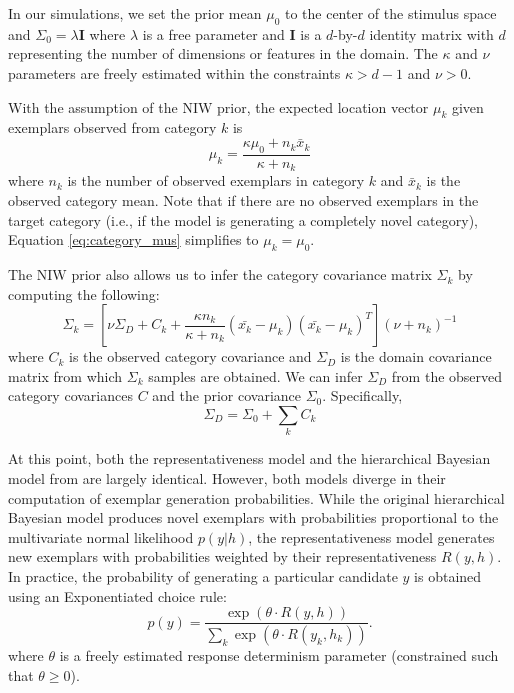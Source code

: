 \documentclass[12pt]{article}
\begin{document}
\begin{flushleft}
In our simulations, we set the prior mean $\mu_0$ to the center of the stimulus
space and $\Sigma_0 = \lambda \mathbf{I}$ where $\lambda$ is a free parameter
and $\mathbf{I}$ is a $d$-by-$d$ identity matrix with $d$ representing the
number of dimensions or features in the domain. The $\kappa$ and $\nu$
parameters are freely estimated within the constraints $\kappa > d-1$ and
$\nu > 0$.

With the assumption of the NIW prior, the expected location vector $\mu_k$ given exemplars observed from category $k$ is
\begin{equation}
  \mu_k = \dfrac
    {\kappa\mu_{0} + n_k \bar{x}_k}
    {\kappa + n_k}
    \label{eq:category_mus}
\end{equation}
where $n_k$ is the number of observed exemplars in category $k$ and $\bar{x}_k$
is the observed category mean. Note that if there are no observed exemplars in
the target category (i.e., if the model is generating a completely novel
category), Equation \ref{eq:category_mus} simplifies to $\mu_k = \mu_0$.

The NIW prior also allows us to infer the category covariance matrix $\Sigma_k$
by computing the following:
\begin{equation}
  \Sigma_k = [\nu \Sigma_D+ C_k +
    \dfrac
    {\kappa n_k}
    {\kappa + n_k}
    (\bar{x_k}-\mu_k)(\bar{x_k}-\mu_k)^T
  ] (\nu + n_k)^{-1}
  \label{eq:Sigma_y}
\end{equation}
where $C_k$ is the observed category covariance and $\Sigma_D$ is the domain
covariance matrix from which $\Sigma_k$ samples are obtained. We can
infer $\Sigma_D$ from the observed category covariances $C$ and the prior
covariance $\Sigma_0$. Specifically,
\begin{equation}
    \Sigma_D = \Sigma_0 + \sum_{k}{C_k}
\end{equation}

At this point, both the representativeness model and the hierarchical Bayesian
model from \cite{jern2013probabilistic} are largely identical. However, both
models diverge in their computation of exemplar generation probabilities. While
the original hierarchical Bayesian model produces novel exemplars with
probabilities proportional to the multivariate normal likelihood $p(y|h)$, the
representativeness model generates new exemplars with probabilities weighted by
their representativeness $R(y,h)$. In practice, the probability of generating a
particular candidate $y$ is obtained using an Exponentiated
\citet{luce1977choice} choice rule:
\begin{equation}
  p(y) = \dfrac
    {\exp( \theta \cdot R(y,h))}
    {\sum_k \exp(\theta  \cdot R(y_k,h_k))} .
\label{eq:representative-choice}
\end{equation}
where $\theta$ is a freely estimated response determinism parameter (constrained
such that $\theta \geq 0$).


\end{flushleft}
\end{document}
